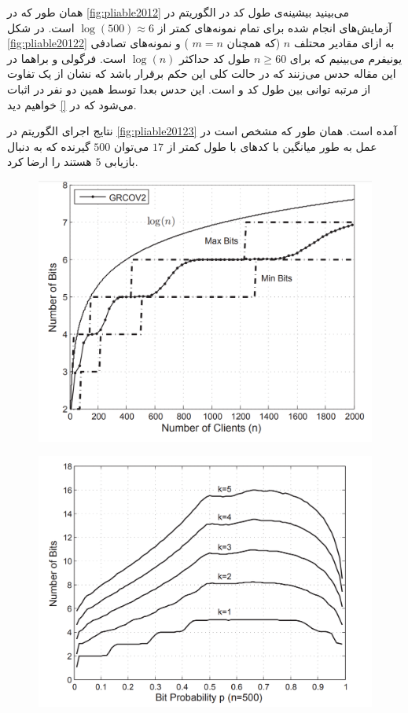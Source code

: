 همان طور که در
\autoref{fig:pliable2012}
می‌بینید بیشینه‌ی طول کد در الگوریتم
در آزمایش‌های انجام شده برای تمام نمونه‌های
\picod
کمتر از
$\log(500) \approx 6$
است. در شکل
\autoref{fig:pliable20122}
به ازای مقادیر محتلف 
$n$
(که همچنان
$m = n$
) و نمونه‌های تصادفی یونیفرم می‌بینیم که برای
$n \geq 60$
طول کد حداکثر
$\log(n)$
است. فرگولی و براهما در این مقاله حدس می‌زنند که در حالت کلی این حکم برقرار باشد که نشان از یک تفاوت از مرتبه توانی بین طول کد
\picod
و 
\icod
است. این حدس بعدا توسط همین دو نفر در
\cite{pliable2015paper}
اثبات می‌شود که در
\autoref{}
خواهیم دید. 

نتایج اجرای الگوریتم
در 
\autoref{fig:pliable20123}
آمده است. همان طور که مشخص است در عمل به طور میانگین با کدهای با طول کمتر از
$17$
می‌توان 
$500$
گیرنده که به دنبال بازیابی 
$5$
هستند را ارضا کرد.
\begin{figure}
	\centering
	\includegraphics[width=0.7\linewidth]{figs/ch3/pliable2012_2}
	\caption{\cite{pliablefirstpaper}}
	\label{fig:pliable20122}
\end{figure}
\begin{figure}
	\centering
	\includegraphics[width=0.7\linewidth]{figs/ch3/pliable2012_3}
	\caption{\cite{pliablefirstpaper}}
	\label{fig:pliable20123}
\end{figure}

